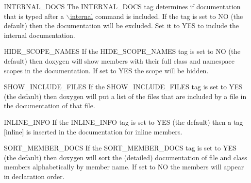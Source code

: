 \begin{DoxyDescription}
\label{config_cfg_internal_docs}
\hypertarget{config_cfg_internal_docs}{}
 
\item[{\ttfamily INTERNAL\_\-DOCS} ] The {\ttfamily INTERNAL\_\-DOCS} tag determines if documentation that is typed after a \hyperlink{commands_cmdinternal}{$\backslash$internal} command is included. If the tag is set to {\ttfamily NO} (the default) then the documentation will be excluded. Set it to {\ttfamily YES} to include the internal documentation.

\label{config_cfg_hide_scope_names}
\hypertarget{config_cfg_hide_scope_names}{}
 
\item[{\ttfamily HIDE\_\-SCOPE\_\-NAMES} ] If the {\ttfamily HIDE\_\-SCOPE\_\-NAMES} tag is set to {\ttfamily NO} (the default) then doxygen will show members with their full class and namespace scopes in the documentation. If set to {\ttfamily YES} the scope will be hidden.

\label{config_cfg_show_include_files}
\hypertarget{config_cfg_show_include_files}{}
 
\item[{\ttfamily SHOW\_\-INCLUDE\_\-FILES} ] If the SHOW\_\-INCLUDE\_\-FILES tag is set to YES (the default) then doxygen will put a list of the files that are included by a file in the documentation of that file.

\label{config_cfg_inline_info}
\hypertarget{config_cfg_inline_info}{}
 
\item[{\ttfamily INLINE\_\-INFO} ] If the {\ttfamily INLINE\_\-INFO} tag is set to {\ttfamily YES} (the default) then a tag \mbox{[}inline\mbox{]} is inserted in the documentation for inline members.

\label{config_cfg_sort_member_docs}
\hypertarget{config_cfg_sort_member_docs}{}
 
\item[{\ttfamily SORT\_\-MEMBER\_\-DOCS} ] If the {\ttfamily SORT\_\-MEMBER\_\-DOCS} tag is set to {\ttfamily YES} (the default) then doxygen will sort the (detailed) documentation of file and class members alphabetically by member name. If set to {\ttfamily NO} the members will appear in declaration order.

\label{config_cfg_sort_brief_docs}
\hypertarget{config_cfg_sort_brief_docs}{}
 

\end{DoxyDescription}

